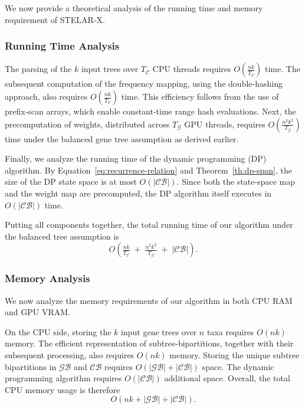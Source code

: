 \documentclass[10pt,a4paper]{article}
\begin{document}
We now provide a theoretical analysis of the running time and memory requirement of STELAR-X. 

\subsubsection{Running Time Analysis}

The parsing of the $k$ input trees over $T_\mathcal{C}$ CPU threads requires $O\!\left(\tfrac{nk}{T_\mathcal{C}}\right)$ time. The subsequent computation of the frequency mapping, using the double-hashing approach, also requires $O\!\left(\tfrac{nk}{T_\mathcal{C}}\right)$ time. This efficiency follows from the use of prefix-scan arrays, which enable constant-time range hash evaluations. Next, the precomputation of weights, distributed across $T_\mathcal{G}$ GPU threads, requires $O\!\left(\tfrac{n^2k^2}{T_\mathcal{G}}\right)$ time under the balanced gene tree assumption as derived earlier. 

Finally, we analyze the running time of the dynamic programming (DP) algorithm. By Equation~\eqref{eq:recurrence-relation} and Theorem~\ref{th:dp-span}, the size of the DP state space is at most $O(|\mathcal{CB}|)$. Since both the state-space map and the weight map are precomputed, the DP algorithm itself executes in $O(|\mathcal{CB}|)$ time.  

Putting all components together, the total running time of our algorithm under the balanced tree assumption is
\[
O\!\left(
\tfrac{nk}{T_\mathcal{C}} \;+\;
\tfrac{n^2k^2}{T_\mathcal{G}} \;+\;
|\mathcal{CB}|
\right).
\]


\subsubsection{Memory Analysis} 

We now analyze the memory requirements of our algorithm in both CPU RAM and GPU VRAM.  

On the CPU side, storing the $k$ input gene trees over $n$ taxa requires $O(nk)$ memory. The efficient representation of subtree-bipartitions, together with their subsequent processing, also requires $O(nk)$ memory. Storing the unique subtree bipartitions in $\mathcal{GB}$ and $\mathcal{CB}$ requires $O(|\mathcal{GB}|+|\mathcal{CB}|)$ space. The dynamic programming algorithm requires $O(|\mathcal{CB}|)$ additional space. Overall, the total CPU memory usage is therefore
\[
O\!\left(nk + |\mathcal{GB}| + |\mathcal{CB}|\right).
\]
\end{document}
